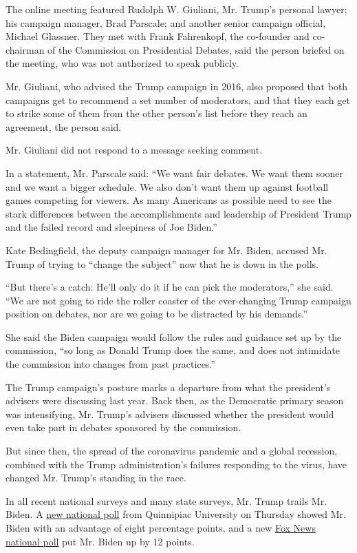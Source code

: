 The online meeting featured Rudolph W. Giuliani, Mr. Trump's personal
lawyer; his campaign manager, Brad Parscale; and another senior campaign
official, Michael Glassner. They met with Frank Fahrenkopf, the
co-founder and co-chairman of the Commission on Presidential Debates,
said the person briefed on the meeting, who was not authorized to speak
publicly.

Mr. Giuliani, who advised the Trump campaign in 2016, also proposed that
both campaigns get to recommend a set number of moderators, and that
they each get to strike some of them from the other person's list before
they reach an agreement, the person said.

Mr. Giuliani did not respond to a message seeking comment.

In a statement, Mr. Parscale said: ``We want fair debates. We want them
sooner and we want a bigger schedule. We also don't want them up against
football games competing for viewers. As many Americans as possible need
to see the stark differences between the accomplishments and leadership
of President Trump and the failed record and sleepiness of Joe Biden.''

Kate Bedingfield, the deputy campaign manager for Mr. Biden, accused Mr.
Trump of trying to ``change the subject'' now that he is down in the
polls.

``But there's a catch: He'll only do it if he can pick the moderators,''
she said. ``We are not going to ride the roller coaster of the
ever-changing Trump campaign position on debates, nor are we going to be
distracted by his demands.''

She said the Biden campaign would follow the rules and guidance set up
by the commission, ``so long as Donald Trump does the same, and does not
intimidate the commission into changes from past practices.''

The Trump campaign's posture marks a departure from what the president's
advisers were discussing last year. Back then, as the Democratic primary
season was intensifying, Mr. Trump's advisers discussed whether the
president would even take part in debates sponsored by the commission.

But since then, the spread of the coronavirus pandemic and a global
recession, combined with the Trump administration's failures responding
to the virus, have changed Mr. Trump's standing in the race.

In all recent national surveys and many state surveys, Mr. Trump trails
Mr. Biden. A
\href{https://poll.qu.edu/national/release-detail?ReleaseID=3664}{new
national poll} from Quinnipiac University on Thursday showed Mr. Biden
with an advantage of eight percentage points, and a new
\href{https://www.foxnews.com/politics/fox-news-poll-biden-widens-lead-over-trump-republicans-enthusiastic-but-fear-motivates-dems}{Fox
News national poll} put Mr. Biden up by 12 points.

